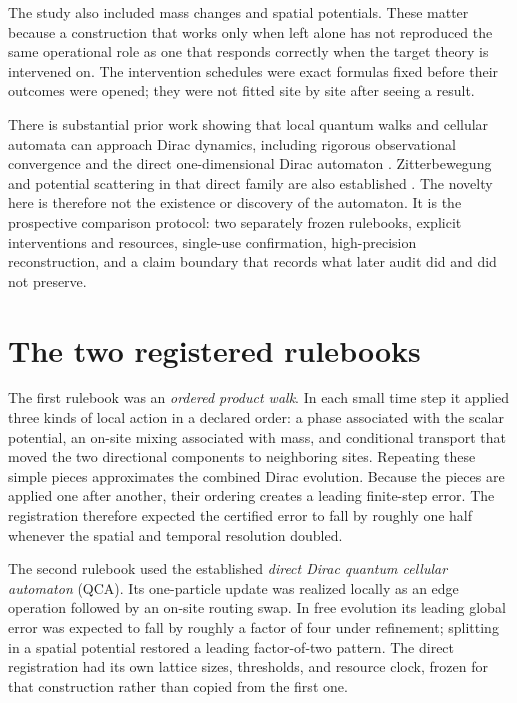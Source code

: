\documentclass[11pt]{article}
\begin{document}
The study also included mass changes and spatial potentials.  These matter
because a construction that works only when left alone has not reproduced the
same operational role as one that responds correctly when the target theory is
intervened on.  The intervention schedules were exact formulas fixed before
their outcomes were opened; they were not fitted site by site after seeing a
result.

There is substantial prior work showing that local quantum walks and cellular
automata can approach Dirac dynamics, including rigorous observational
convergence and the direct one-dimensional Dirac automaton
\citep{Arrighi2014DiracWalk,Bisio2015QuantumFieldQCA}.  Zitterbewegung and
potential scattering in that direct family are also established
\citep{Bisio2013DiracQCADynamics}.  The novelty here is therefore not the
existence or discovery of the automaton.  It is the prospective comparison
protocol: two separately frozen rulebooks, explicit interventions and
resources, single-use confirmation, high-precision reconstruction, and a
claim boundary that records what later audit did and did not preserve.

\section{The two registered rulebooks}

The first rulebook was an \emph{ordered product walk}.  In each small time step
it applied three kinds of local action in a declared order: a phase associated
with the scalar potential, an on-site mixing associated with mass, and
conditional transport that moved the two directional components to neighboring
sites.  Repeating these simple pieces approximates the combined Dirac
evolution.  Because the pieces are applied one after another, their ordering
creates a leading finite-step error.  The registration therefore expected the
certified error to fall by roughly one half whenever the spatial and temporal
resolution doubled.

The second rulebook used the established \emph{direct Dirac quantum cellular
automaton} (QCA).  Its one-particle update was realized locally as an edge operation
followed by an on-site routing swap.  In free evolution its leading global
error was expected to fall by roughly a factor of four under refinement;
splitting in a spatial potential restored a leading factor-of-two pattern.
The direct registration had its own lattice sizes, thresholds, and resource
clock, frozen for that construction rather than copied from the first one.
\end{document}
